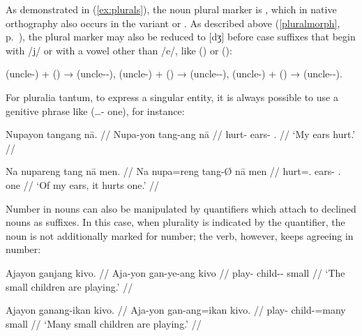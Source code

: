 As demonstrated in (\ref{ex:plurals}), the noun plural marker is 
, which in native orthography also occurs in the variant 
 or . As described above (\autoref{pluralmorph}, 
p.~\pageref{pluralmorph}), the plural marker may also be reduced to [dʒ] 
 before case suffixes that begin with /j/ or with a vowel other than 
/e/, like  (\Aarg{}) or  (\Dat{}):

\pex
	\a {} (uncle-\Aarg{})
		+  (\Pl{}) %
		→  (uncle-\Pl{}-\Aarg{}),
	\a {} (uncle-\Gen{})
		+  (\Pl{}) %
		→  (uncle-\Pl{}-\Gen{}),
	\a {} (uncle-\Dat{})
		+  (\Pl{}) %
		→  (uncle-\Pl{}-\Dat{}).
\xe

For pluralia tantum, to express a singular entity, it is always possible to 
use a genitive phrase like  (…-\Gen{} 
one), for instance:

\pex
\a\begingl
	\gla Nupayon tangang nā. //
	\glb Nupa-yon tang-ang nā //
	\glc hurt-\TplN{} ears-\Aarg{} \Fsg{}.\Gen{} //
	\glft `My ears hurt.' //
\endgl

\a\label{ex:gensubj}\begingl
	\gla Na nupareng tang nā men. //
	\glb Na nupa=reng tang-Ø nā men //
	\glc \GenT{} hurt=\TsgI{}.\Aarg{} ears-\Top{} \Fsg{}.\Gen{} one //
	\glft `Of my ears, it hurts one.' //
\endgl
\xe

Number in nouns can also be manipulated by quantifiers which attach to declined 
nouns as suffixes. In this case, when plurality is indicated by the 
quantifier, the noun is not additionally marked for number; the verb, however, 
keeps agreeing in number:

\pex
\a\begingl
	\gla Ajayon ganjang kivo. //
	\glb Aja-yon gan-ye-ang kivo //
	\glc play-\TsgN{} child-\Pl{}-\Aarg{} small //
	\glft `The small children are playing.' //
\endgl
	
\a\label{ex:nounquant}\begingl
	\gla Ajayon ganang-ikan kivo. //
	\glb Aja-yon gan-ang=ikan kivo. //
	\glc play-\TsgN{} child-\Aarg{}=many small //
	\glft `Many small children are playing.' //
\endgl


